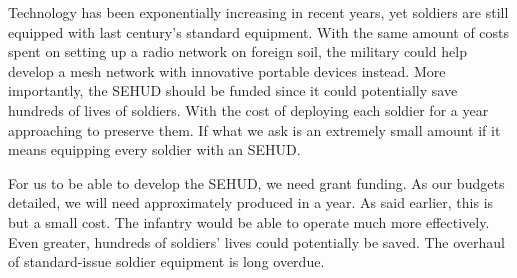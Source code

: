 Technology has been exponentially increasing in recent years, yet soldiers are
still equipped with last century's standard equipment. With the same amount of
costs spent on setting up a radio network on foreign soil, the military could
help develop a mesh network with innovative portable devices instead. More
importantly, the SEHUD should be funded since it could potentially save
hundreds of lives of soldiers. With the cost of deploying each soldier for a
year approaching
to preserve them. If
what we ask is an extremely small amount if it means equipping every soldier
with an SEHUD.


For us to be able to develop the SEHUD, we need grant funding. As our budgets
detailed, we will need approximately
produced in a year. As said earlier, this is but a small cost. The infantry
would be able to operate much more effectively. Even greater, hundreds of
soldiers' lives could potentially be saved. The overhaul of standard-issue
soldier equipment is long overdue.
